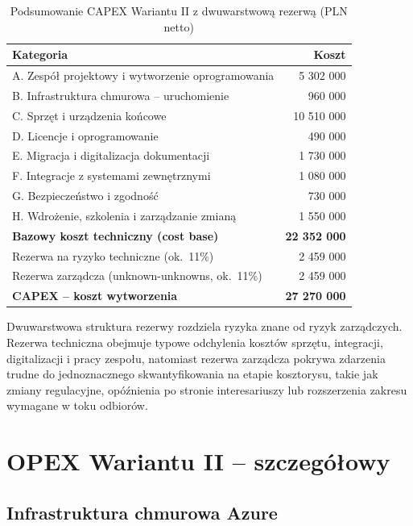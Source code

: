 \begin{table}[h]
\centering
\small
\renewcommand{\arraystretch}{1.2}
\begin{tabular}{|L{10.5cm}|r|}
\hline
{}\textbf{Kategoria} & \textbf{Koszt} \\
\hline
A. Zespół projektowy i wytworzenie oprogramowania & 5 302 000 \\
\hline
B. Infrastruktura chmurowa -- uruchomienie & 960 000 \\
\hline
C. Sprzęt i urządzenia końcowe & 10 510 000 \\
\hline
D. Licencje i oprogramowanie & 490 000 \\
\hline
E. Migracja i digitalizacja dokumentacji & 1 730 000 \\
\hline
F. Integracje z systemami zewnętrznymi & 1 080 000 \\
\hline
G. Bezpieczeństwo i zgodność & 730 000 \\
\hline
H. Wdrożenie, szkolenia i zarządzanie zmianą & 1 550 000 \\
\hline
{}\textbf{Bazowy koszt techniczny (cost base)} & \textbf{22 352 000} \\
\hline
Rezerwa na ryzyko techniczne (ok.~11\%) & 2 459 000 \\
\hline
Rezerwa zarządcza (unknown-unknowns, ok.~11\%) & 2 459 000 \\
\hline
{}\textbf{CAPEX -- koszt wytworzenia} & \textbf{27 270 000} \\
\hline
\end{tabular}
\caption{Podsumowanie CAPEX Wariantu II z dwuwarstwową rezerwą (PLN netto)}
\label{tab:capex_suma}
\end{table}

Dwuwarstwowa struktura rezerwy rozdziela ryzyka znane od ryzyk zarządczych. Rezerwa techniczna obejmuje typowe odchylenia kosztów sprzętu, integracji, digitalizacji i pracy zespołu, natomiast rezerwa zarządcza pokrywa zdarzenia trudne do jednoznacznego skwantyfikowania na etapie kosztorysu, takie jak zmiany regulacyjne, opóźnienia po stronie interesariuszy lub rozszerzenia zakresu wymagane w toku odbiorów.


\section{OPEX Wariantu II -- szczegółowy}

\subsection{Infrastruktura chmurowa Azure}

